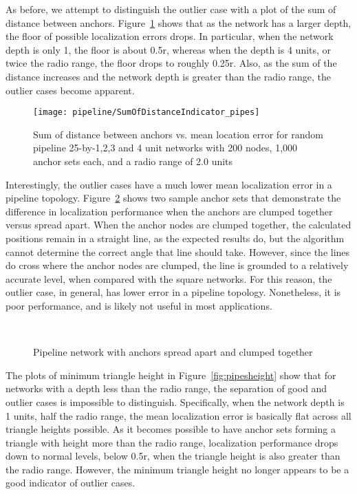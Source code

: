 As before, we attempt to distinguish the outlier case with a plot of the sum of distance between anchors. Figure~\ref{fig:pipessum} shows that as the network has a larger depth, the floor of possible localization errors drops.  In particular, when the network depth is only 1, the floor is about 0.5r, whereas when the depth is 4 units, or twice the radio range, the floor drops to roughly 0.25r.  Also, as the sum of the distance increases and the network depth is greater than the radio range, the outlier cases become apparent.  

\begin{figure}
  \centering
	\texttt{[image: pipeline/SumOfDistanceIndicator\_pipes]}
	\caption[Sum of distance between anchors vs. mean location error]{Sum of distance between anchors vs. mean location error for random pipeline 25-by-1,2,3 and 4 unit networks with 200 nodes, 1,000 anchor sets each, and a radio range of 2.0 units}
	\label{fig:pipessum}
\end{figure}

Interestingly, the outlier cases have a much lower mean localization error in a pipeline topology.  Figure~\ref{fig:pipesspread} shows two sample anchor sets that demonstrate the difference in localization performance when the anchors are clumped together versus spread apart.  When the anchor nodes are clumped together, the calculated positions remain in a straight line, as the expected results do, but the algorithm cannot determine the correct angle that line should take.  However, since the lines do cross where the anchor nodes are clumped, the line is grounded to a relatively accurate level, when compared with the square networks. For this reason, the outlier case, in general, has lower error in a pipeline topology. Nonetheless, it is poor performance, and is likely not useful in most applications.

\begin{figure}
  \centering
	\\
	\caption{Pipeline network with anchors spread apart and clumped together}
	\label{fig:pipesspread}
\end{figure}

The plots of minimum triangle height in Figure~\ref{fig:pipesheight} show that for networks with a depth less than the radio range, the separation of good and outlier cases is impossible to distinguish.  Specifically, when the network depth is 1 units, half the radio range, the mean localization error is basically flat across all triangle heights possible.  As it becomes possible to have anchor sets forming a triangle with height more than the radio range, localization performance drops down to normal levels, below 0.5r, when the triangle height is also greater than the radio range.  However, the minimum triangle height no longer appears to be a good indicator of outlier cases. 

